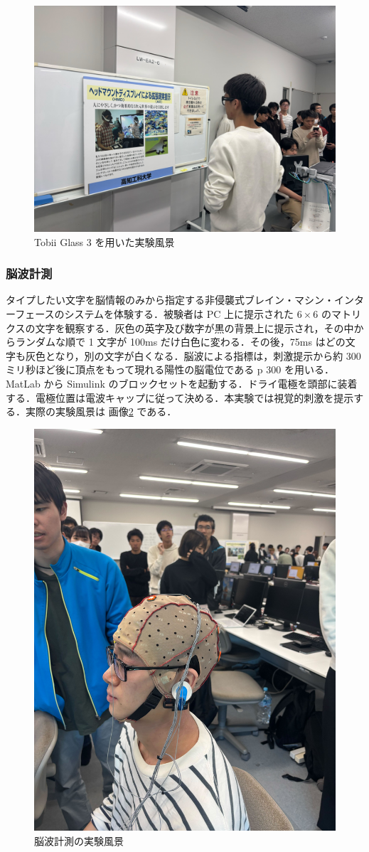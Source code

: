 \documentclass[dvipdfmx, titlepage, t]{jsarticle}
\begin{document}
    \begin{figure}[H]
        \centering
        \includegraphics[keepaspectratio, width=0.6\linewidth]{figure/tobii.jpg}
        \caption{Tobii Glass 3 を用いた実験風景}
        \label{fig:tobii}
    \end{figure}

    \subsubsection{脳波計測}
    タイプしたい文字を脳情報のみから指定する非侵襲式ブレイン・マシン・インターフェースのシステムを体験する．被験者は PC 上に提示された $6 \times 6$ のマトリクスの文字を観察する．灰色の英字及び数字が黒の背景上に提示され，その中からランダムな順で 1 文字が 100ms だけ白色に変わる．その後，75ms はどの文字も灰色となり，別の文字が白くなる．脳波による指標は，刺激提示から約 300 ミリ秒ほど後に頂点をもって現れる陽性の脳電位である p 300 を用いる． MatLab から Simulink のブロックセットを起動する．ドライ電極を頭部に装着する．電極位置は電波キャップに従って決める．本実験では視覚的刺激を提示する．実際の実験風景は 画像\ref{fig:keisoku} である．

    \begin{figure}[H]
        \centering
        \includegraphics[keepaspectratio, width=0.6\linewidth]{figure/keisoku.jpg}
        \caption{脳波計測の実験風景}
        \label{fig:keisoku}
    \end{figure}
\end{document}
